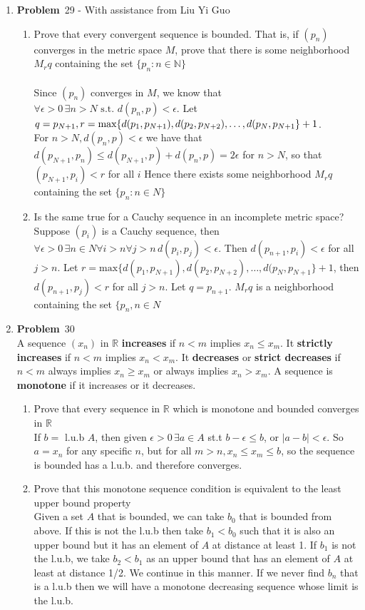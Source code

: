 \documentclass[12pt]{amsart}
\newcommand{\benu}{\begin{enumerate}}
\newcommand{\eenu}{\end{enumerate}}
\theoremstyle{definition}
\newcommand{\mbR}{\mathbb{R}}
\newcommand{\mbN}{\mathbb{N}}
\newcommand{\itep}{\item {\bfseries Problem}\ }
\begin{document}
\begin{enumerate}[series=p]
\itep 29 - With assistance from Liu Yi Guo\\
\benu
\item Prove that every convergent sequence is bounded.  That is, if $(p_n)$ converges in the metric space $M$, prove that there is some neighborhood $M_rq$ containing the set $\{p_n:n\in \mbN\}$\\
\\
Since $(p_n)$ converges in $M$, we know that
$\forall \epsilon > 0 \, \exists n>N \text{ s.t. } d(p_n,p) < \epsilon$.  Let $q = p_{N+1}, \\
r = \text{max} \{d(p_1, p_{N+1}), d(p_2, p_{N+2}), \dots,d(p_N, p_{N+1}\} +1$.
\\
For $n > N, d(p_n, p) < \epsilon$ we have that
$d(p_{N+1}, p_n) \leq d(p_{N+1}, p) + d(p_n, p) = 2\epsilon$ for $n > N$, so that $(p_{N+1}, p_i) < r$ for all $i$
Hence there exists some neighborhood $M_rq$ containing the set $\{p_n: n \in N\}$\\

\item Is the same true for a Cauchy sequence in an incomplete metric space?
\\
Suppose $(p_i)$ is a Cauchy sequence, then
$\forall \epsilon > 0 \, \exists n \in N \forall i > n \forall j > n \, d(p_i, p_j) < \epsilon$.
Then $d(p_{n+1}, p_i) < \epsilon$ for all $j > n$.  Let $r = \text{max} \{d(p_1, p_{N+1}), d(p_2, p_{N+2}), \dots, d(p_N, p_{N+1}\} +1$, then $d(p_{n+1}, p_j) < r$ for all $j > n$.  Let $q = p_{n+1}$.  $M_rq$ is a neighborhood containing the set $\{p_n, n \in N$
\eenu
\newpage


\itep 30\\
A sequence $(x_n)$ in $\mbR$ \textbf{increases} if $n< m$ implies $x_n \leq x_m$.  It \textbf{strictly increases} if $n < m$ implies $x_n < x_m$.  It \textbf{decreases} or \textbf{strict decreases} if $n < m$ always implies $x_n \geq x_m$ or always implies $x_n > x_m$.  A sequence is \textbf{monotone} if it increases or it decreases.
\benu
\item Prove that every sequence in $\mbR$ which is monotone and bounded converges in $\mbR$
\\
If $b = $ l.u.b $A$, then given $\epsilon > 0 \, \exists a \in A$ st.t $b - \epsilon \leq b$, or $|a -b | < \epsilon$.  So $a = x_n$ for any specific $n$, but for all $m > n, x_n \leq x_m \leq b$, so the sequence is bounded has a l.u.b. and therefore converges.
\item Prove that this monotone sequence condition is equivalent to the least upper bound property
\\
Given a set $A$ that is bounded, we can take $b_0$ that is bounded from above.  If this is not the l.u.b then take $b_1<b_0$ such that it is also an upper bound but it has an element of $A$ at distance at least 1.  If $b_1$ is not the l.u.b, we take $b_2<b_1$ as an upper bound that has an element of $A$ at least at distance 1/2.  We continue in this manner.  If we never find $b_n$ that is a l.u.b then we will have a monotone decreasing sequence whose limit is the l.u.b.
\\
\eenu


\end{enumerate}
\end{document}
